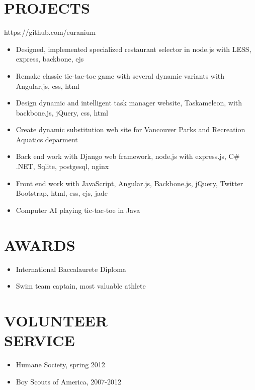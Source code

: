 \documentclass[line,margin]{res}
\begin{document}
\begin{resume}
\section{PROJECTS}
	{\sl } \hfill https://github.com/euranium \\ 					
	\begin{itemize} \itemsep -1pt
		\item Designed, implemented specialized restaurant selector in node.js with LESS, express, backbone, ejs
		\item Remake classic tic-tac-toe game with several dynamic variants with Angular.js, css, html
		\item Design dynamic and intelligent task manager website, Taskameleon, with backbone.js, jQuery, css, html
		\item Create dynamic substitution web site for Vancouver Parks and Recreation Aquatics deparment
		\item Back end work with Django web framework, node.js with express.js, C\# .NET, Sqlite, postgesql, nginx 
		\item Front end work with JavaScript, Angular.js, Backbone.js, jQuery, Twitter Bootstrap, html, css, ejs, jade 
		\item Computer AI playing tic-tac-toe in Java
	\end{itemize}

\section{AWARDS}
	\begin{itemize} \itemsep -1pt
		\item International Baccalaurete Diploma
		\item Swim team captain, most valuable athlete
	\end{itemize}
 
\section{VOLUNTEER \\ SERVICE}
		\begin{itemize} \itemsep -1pt
			\item Humane Society, spring 2012
			\item Boy Scouts of America, 2007-2012
		\end{itemize}


\end{resume}
\end{document}
